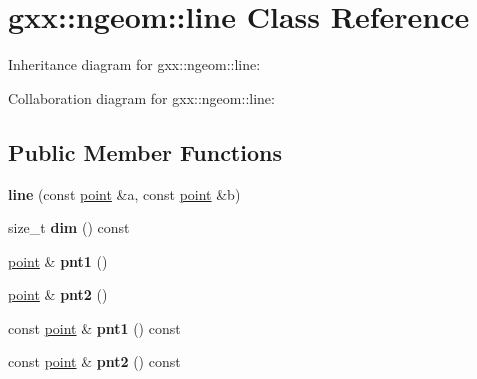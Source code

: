 \hypertarget{classgxx_1_1ngeom_1_1line}{}\section{gxx\+:\+:ngeom\+:\+:line Class Reference}
\label{classgxx_1_1ngeom_1_1line}


Inheritance diagram for gxx\+:\+:ngeom\+:\+:line\+:


Collaboration diagram for gxx\+:\+:ngeom\+:\+:line\+:
\subsection*{Public Member Functions}
\begin{DoxyCompactItemize}
\item 
{\bfseries line} (const \hyperlink{classgxx_1_1ngeom_1_1point}{point} \&a, const \hyperlink{classgxx_1_1ngeom_1_1point}{point} \&b)\hypertarget{classgxx_1_1ngeom_1_1line_a7f358cee4659a83476e6dcd47af30e45}{}\label{classgxx_1_1ngeom_1_1line_a7f358cee4659a83476e6dcd47af30e45}

\item 
size\+\_\+t {\bfseries dim} () const \hypertarget{classgxx_1_1ngeom_1_1line_a9ba1029a43a56039e27a5cd10a3c919b}{}\label{classgxx_1_1ngeom_1_1line_a9ba1029a43a56039e27a5cd10a3c919b}

\item 
\hyperlink{classgxx_1_1ngeom_1_1point}{point} \& {\bfseries pnt1} ()\hypertarget{classgxx_1_1ngeom_1_1line_ab5fe9fe6f0c26203063566f0d29a2905}{}\label{classgxx_1_1ngeom_1_1line_ab5fe9fe6f0c26203063566f0d29a2905}

\item 
\hyperlink{classgxx_1_1ngeom_1_1point}{point} \& {\bfseries pnt2} ()\hypertarget{classgxx_1_1ngeom_1_1line_a3c01a01154ef2006df2545d816d314c4}{}\label{classgxx_1_1ngeom_1_1line_a3c01a01154ef2006df2545d816d314c4}

\item 
const \hyperlink{classgxx_1_1ngeom_1_1point}{point} \& {\bfseries pnt1} () const \hypertarget{classgxx_1_1ngeom_1_1line_af17d242cb6692d3c8d73d676c3283173}{}\label{classgxx_1_1ngeom_1_1line_af17d242cb6692d3c8d73d676c3283173}

\item 
const \hyperlink{classgxx_1_1ngeom_1_1point}{point} \& {\bfseries pnt2} () const \hypertarget{classgxx_1_1ngeom_1_1line_a56ad095e591a7cebdc709e8dc7385a4f}{}\label{classgxx_1_1ngeom_1_1line_a56ad095e591a7cebdc709e8dc7385a4f}


\end{DoxyCompactItemize}
